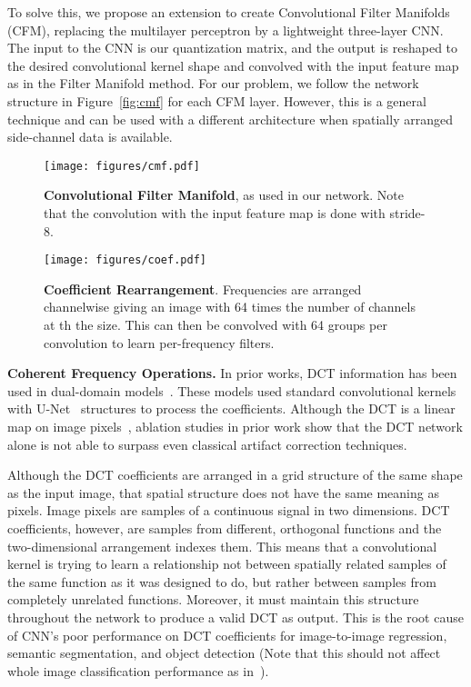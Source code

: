 \documentclass[runningheads]{llncs}
\begin{document}
To solve this, we propose an extension to create Convolutional Filter Manifolds (CFM), replacing the multilayer perceptron by a lightweight three-layer CNN. The input to the CNN is our quantization matrix, and the output is reshaped to the desired convolutional kernel shape and convolved with the input feature map as in the Filter Manifold method. For our problem, we follow the network structure in Figure~\ref{fig:cmf} for each CFM layer. However, this is a general technique and can be used with a different architecture when spatially arranged side-channel data is available. 

\begin{figure}[t]
    \begin{minipage}{0.45\linewidth}
        \centering
        \texttt{[image: figures/cmf.pdf]}
        \caption{\textbf{Convolutional Filter Manifold}, as used in our network. Note that the convolution with the input
        feature map is done with stride-8.}
        \label{fig:cmf}
    \end{minipage}
    \hspace{0.03\linewidth}
    \begin{minipage}{0.47\linewidth}
        \centering
        \texttt{[image: figures/coef.pdf]}
        \caption{\textbf{Coefficient Rearrangement}. Frequencies are arranged channelwise giving an image with 64 times the number of channels
        at th the size. This can then be convolved with 64 groups per convolution to learn per-frequency filters.}
        \label{fig:coef}
    \end{minipage}
\end{figure}

\noindent\textbf{Coherent Frequency Operations.}
In prior works, DCT information has been used in dual-domain models~\cite{wang2016d3,zhang2018dmcnn}. These models used standard  convolutional kernels with U-Net~\cite{ronneberger2015u} structures to process the coefficients. Although the DCT is a linear map on image pixels~\cite{smith1994fast, ehrlich2019deep}, ablation studies in prior work show that the DCT network alone is not able to surpass even classical artifact correction techniques.

Although the DCT coefficients are arranged in a grid structure of the same shape as the input image, that spatial structure does not have the same meaning as pixels. Image pixels are samples of a continuous signal in two dimensions. DCT coefficients, however, are samples from different, orthogonal functions and the two-dimensional arrangement indexes them. This means that a  convolutional kernel is trying to learn a relationship not between spatially related samples of the same function as it was designed to do, but rather between samples from completely unrelated functions. Moreover, it must maintain
this structure throughout the network to produce a valid DCT as output. This is the root cause of CNN's poor performance on DCT coefficients for image-to-image regression, semantic segmentation, and object detection (Note that this should not affect whole image classification performance as in~\cite{gueguen2018faster,ghosh2016deep}).
\end{document}
